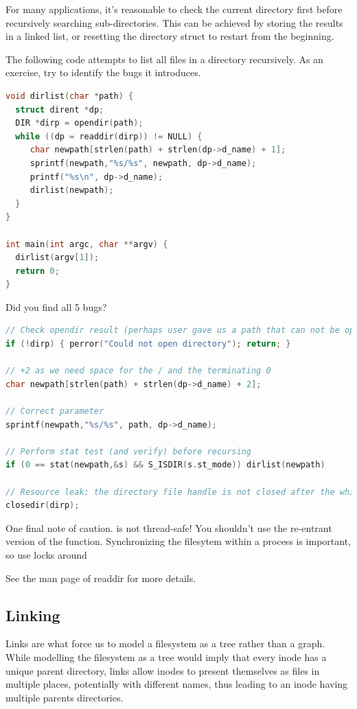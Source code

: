 For many applications, it's reasonable to check the current directory first before recursively searching sub-directories.
This can be achieved by storing the results in a linked list, or resetting the directory struct to restart from the beginning.

The following code attempts to list all files in a directory recursively.
As an exercise, try to identify the bugs it introduces.

\begin{lstlisting}[language=C]
void dirlist(char *path) {
  struct dirent *dp;
  DIR *dirp = opendir(path);
  while ((dp = readdir(dirp)) != NULL) {
     char newpath[strlen(path) + strlen(dp->d_name) + 1];
     sprintf(newpath,"%s/%s", newpath, dp->d_name);
     printf("%s\n", dp->d_name);
     dirlist(newpath);
  }
}

int main(int argc, char **argv) {
  dirlist(argv[1]);
  return 0;
}
\end{lstlisting}

Did you find all 5 bugs?

\begin{lstlisting}[language=C]
// Check opendir result (perhaps user gave us a path that can not be opened as a directory
if (!dirp) { perror("Could not open directory"); return; }

// +2 as we need space for the / and the terminating 0
char newpath[strlen(path) + strlen(dp->d_name) + 2];

// Correct parameter
sprintf(newpath,"%s/%s", path, dp->d_name);

// Perform stat test (and verify) before recursing
if (0 == stat(newpath,&s) && S_ISDIR(s.st_mode)) dirlist(newpath)

// Resource leak: the directory file handle is not closed after the while loop
closedir(dirp);
\end{lstlisting}

One final note of caution.
 is not thread-safe!
You shouldn't use the re-entrant version of the function.
Synchronizing the filesytem within a process is important, so use locks around 

See the man page of readdir for more details.

\subsection{Linking}

Links are what force us to model a filesystem as a tree rather than a graph.
While modelling the filesystem as a tree would imply that every inode has a unique parent directory, links allow inodes to present themselves as files in multiple places, potentially with different names, thus leading to an inode having multiple parents directories.

